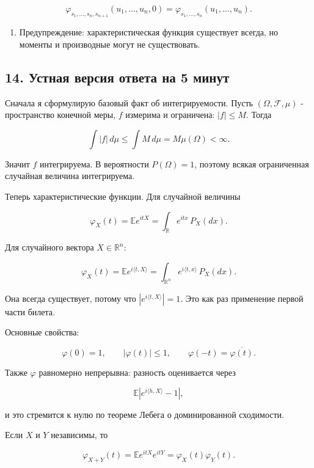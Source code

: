 \documentclass[
  11pt,
  a4paper,
]{article}
\providecommand{\tightlist}{%
  \setlength{\itemsep}{0pt}\setlength{\parskip}{0pt}}
\begin{document}
\[
\varphi_{s_1,\ldots,s_n,s_{n+1}}(u_1,\ldots,u_n,0)
=
\varphi_{s_1,\ldots,s_n}(u_1,\ldots,u_n).
\]

\begin{enumerate}
\def\labelenumi{\arabic{enumi}.}
\setcounter{enumi}{6}
\tightlist
\item
  Предупреждение: характеристическая функция существует всегда, но
  моменты и производные могут не существовать.
\end{enumerate}

\subsection{14. Устная версия ответа на 5
минут}\label{ux443ux441ux442ux43dux430ux44f-ux432ux435ux440ux441ux438ux44f-ux43eux442ux432ux435ux442ux430-ux43dux430-5-ux43cux438ux43dux443ux442}

Сначала я сформулирую базовый факт об интегрируемости. Пусть
\((\Omega,\mathcal F,\mu)\) - пространство конечной меры, \(f\) измерима
и ограничена: \(|f|\le M\). Тогда

\[
\int |f|\,d\mu\le\int M\,d\mu=M\mu(\Omega)<\infty.
\]

Значит \(f\) интегрируема. В вероятности \(P(\Omega)=1\), поэтому всякая
ограниченная случайная величина интегрируема.

Теперь характеристические функции. Для случайной величины

\[
\varphi_X(t)=\mathbb E e^{itX}
=\int_{\mathbb R} e^{itx}\,P_X(dx).
\]

Для случайного вектора \(X\in\mathbb R^n\):

\[
\varphi_X(t)=\mathbb E e^{i\langle t,X\rangle}
=\int_{\mathbb R^n}e^{i\langle t,x\rangle}\,P_X(dx).
\]

Она всегда существует, потому что \(|e^{i\langle t,X\rangle}|=1\). Это
как раз применение первой части билета.

Основные свойства:

\[
\varphi(0)=1,\qquad |\varphi(t)|\le1,\qquad
\varphi(-t)=\overline{\varphi(t)}.
\]

Также \(\varphi\) равномерно непрерывна: разность оценивается через

\[
\mathbb E|e^{i\langle h,X\rangle}-1|,
\]

и это стремится к нулю по теореме Лебега о доминированной сходимости.

Если \(X\) и \(Y\) независимы, то

\[
\varphi_{X+Y}(t)=\mathbb E e^{itX}e^{itY}
=\varphi_X(t)\varphi_Y(t).
\]
\end{document}
